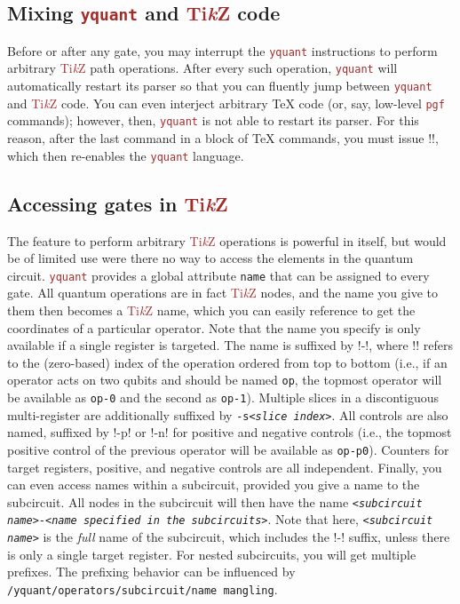 \documentclass{scrartcl}
\def\TikZ{\textcolor{brown}{Ti\textit kZ}}
\def\pkg#1{\textcolor{brown}{\texttt{#1}}}
\def\ttlink{\link\texttt}
\def\Yquant{\pkg{yquant}}
\begin{document}
      \subsection{Mixing \texorpdfstring{\Yquant}{yquant} and \texorpdfstring{\TikZ}{TikZ} code}
         \linkdef\yquant
         Before or after any gate, you may interrupt the \Yquant{} instructions to perform arbitrary \TikZ{} path operations.
         After every such operation, \Yquant{} will automatically restart its parser so that you can fluently jump between \Yquant{} and \TikZ{} code.
         You can even interject arbitrary \TeX{} code (or, say, low\hyp level \pkg{pgf} commands); however, then, \Yquant{} is not able to restart its parser.
         For this reason, after the last command in a block of \TeX{} commands, you must issue \tex!\yquant!, which then re\hyp enables the \Yquant{} language.

      \subsection{Accessing gates in \texorpdfstring{\TikZ}{TikZ}}
         The feature to perform arbitrary \TikZ{} operations is powerful in itself, but would be of limited use were there no way to access the elements in the quantum circuit.
         \Yquant{} provides a global attribute \texttt{name} that can be assigned to every gate.
         All quantum operations are in fact \TikZ{} nodes, and the name you give to them then becomes a \TikZ{} name, which you can easily reference to get the coordinates of a particular operator.
         Note that the name you specify is only available if a single register is targeted.
         The name is suffixed by \tex!-\idx!, where \tex!\idx! refers to the (zero\hyp based) index of the operation ordered from top to bottom (i.e., if an operator acts on two qubits and should be named \texttt{op}, the topmost operator will be available as \texttt{op-0} and the second as \texttt{op-1}).
         Multiple slices in a discontiguous multi\hyp register are additionally suffixed by \texttt{-s\textit{<slice index>}}.
         All controls are also named, suffixed by \tex!-p\idx! or \tex!-n\idx! for positive and negative controls (i.e., the topmost positive control of the previous operator will be available as \texttt{op-p0}).
         Counters for target registers, positive, and negative controls are all independent.
         Finally, you can even access names within a subcircuit, provided you give a name to the subcircuit.
         All nodes in the subcircuit will then have the name \texttt{\textit{<subcircuit name>}-\textit{<name specified in the subcircuits>}}.
         Note that here, \texttt{\textit{<subcircuit name>}} is the \emph{full} name of the subcircuit, which includes the \tex!-\idx! suffix, unless there is only a single target register.
         For nested subcircuits, you will get multiple prefixes.
         The prefixing behavior can be influenced by \ttlink{/yquant/operators/subcircuit/name mangling}.
\end{document}
